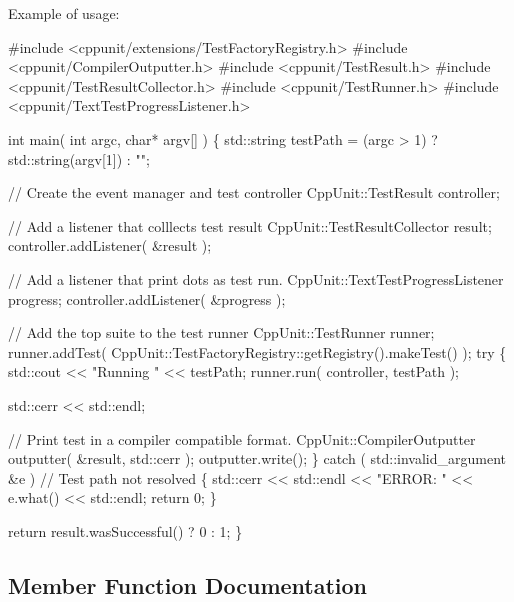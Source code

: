 Example of usage\+: 
\begin{DoxyCode}
\textcolor{preprocessor}{#include <cppunit/extensions/TestFactoryRegistry.h>}
\textcolor{preprocessor}{#include <cppunit/CompilerOutputter.h>}
\textcolor{preprocessor}{#include <cppunit/TestResult.h>}
\textcolor{preprocessor}{#include <cppunit/TestResultCollector.h>}
\textcolor{preprocessor}{#include <cppunit/TestRunner.h>}
\textcolor{preprocessor}{#include <cppunit/TextTestProgressListener.h>}


\textcolor{keywordtype}{int} 
main( \textcolor{keywordtype}{int} argc, \textcolor{keywordtype}{char}* argv[] )
\{
  std::string testPath = (argc > 1) ? std::string(argv[1]) : \textcolor{stringliteral}{""};

  \textcolor{comment}{// Create the event manager and test controller}
  CppUnit::TestResult controller;

  \textcolor{comment}{// Add a listener that colllects test result}
  CppUnit::TestResultCollector result;
  controller.addListener( &result );        

  \textcolor{comment}{// Add a listener that print dots as test run.}
  CppUnit::TextTestProgressListener progress;
  controller.addListener( &progress );      

  \textcolor{comment}{// Add the top suite to the test runner}
  CppUnit::TestRunner runner;
  runner.addTest( CppUnit::TestFactoryRegistry::getRegistry().makeTest() );   
  \textcolor{keywordflow}{try}
  \{
    std::cout << \textcolor{stringliteral}{"Running "}  <<  testPath;
    runner.run( controller, testPath );

    std::cerr << std::endl;

    \textcolor{comment}{// Print test in a compiler compatible format.}
    CppUnit::CompilerOutputter outputter( &result, std::cerr );
    outputter.write();                      
  \}
  \textcolor{keywordflow}{catch} ( std::invalid\_argument &e )  \textcolor{comment}{// Test path not resolved}
  \{
    std::cerr  <<  std::endl  
               <<  \textcolor{stringliteral}{"ERROR: "}  <<  e.what()
               << std::endl;
    \textcolor{keywordflow}{return} 0;
  \}

  \textcolor{keywordflow}{return} result.wasSuccessful() ? 0 : 1;
\}
\end{DoxyCode}
 

\subsection{Member Function Documentation}
